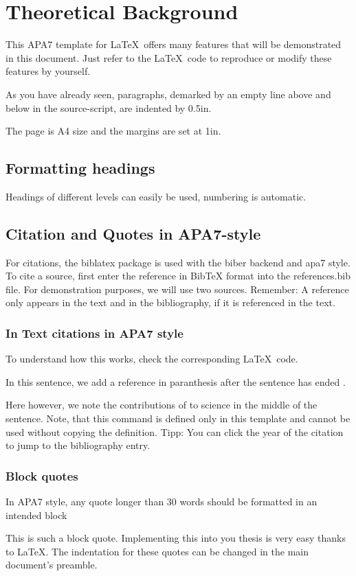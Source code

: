 \section{Theoretical Background}



This APA7 template for \LaTeX\ offers many features that will be demonstrated in this document. Just refer to the \LaTeX\ code to reproduce or modify these features by yourself.

As you have already seen, paragraphs, demarked by an empty line above and below in the source-script, are indented by 0.5in. 

The page is A4 size and the margins are set at 1in. 

\subsection{Formatting headings}
Headings of different levels can easily be used, numbering is automatic.
\subsection{Citation and Quotes in APA7-style}
For citations, the biblatex package is used with the biber backend and apa7 style. To cite a source, first enter the reference in BibTeX format into the references.bib file. For demonstration purposes, we will use two sources. Remember: A reference only appears in the text and in the bibliography, if it is referenced in the text.

\subsubsection{In Text citations in APA7 style}
To understand how this works, check the corresponding \LaTeX\ code. 

In this sentence, we add a reference in paranthesis after the sentence has ended \parencite{Tversky1974}. 

Here however, we note the contributions of  to science in the middle of the sentence. Note, that this command is defined only in this template and cannot be used without copying the definition. Tipp: You can click the year of the citation to jump to the bibliography entry. 

\subsubsection{Block quotes}
In APA7 style, any quote longer than 30 words should be formatted in an intended block

\begin{displayquote}
    This is such a block quote. Implementing this into you thesis is very easy thanks to \LaTeX. The indentation for these quotes can be changed in the main document's preamble.
\end{displayquote}
